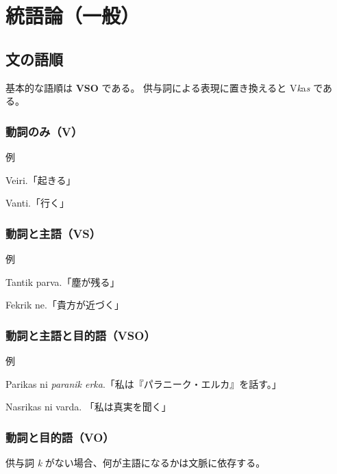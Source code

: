 \chapter{統語論（一般）}

\section{文の語順}

基本的な語順は \textbf{VSO} である。
供与詞による表現に置き換えると V\emph{k}a\emph{s} である。

\subsection{動詞のみ（V）}

\begin{itembox}[l]{例}
    \begin{pindent}
        \noindent
        Veiri.「起きる」

        \noindent
        Vanti.「行く」
    \end{pindent}
\end{itembox}

\subsection{動詞と主語（VS）}

\begin{itembox}[l]{例}
    \begin{pindent}
        \noindent
        Tantik parva.「塵が残る」

        \noindent
        Fekrik ne.「貴方が近づく」
    \end{pindent}
\end{itembox}

\subsection{動詞と主語と目的語（VSO）}

\begin{itembox}[l]{例}
    \begin{pindent}
        \noindent
        Parikas ni \emph{paranik erka}.「私は『パラニーク・エルカ』を話す。」

        \noindent
        Nasrikas ni varda. 「私は真実を聞く」
    \end{pindent}
\end{itembox}

\subsection{動詞と目的語（VO）}
供与詞 \emph{k} がない場合、何が主語になるかは文脈に依存する。

